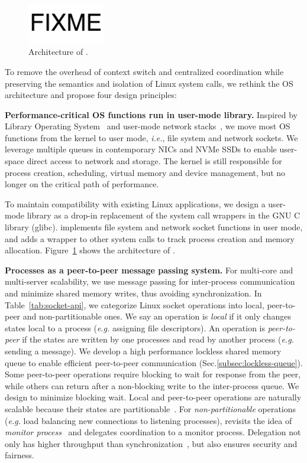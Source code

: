\begin{figure}[t]
	\centering
	\includegraphics[width=0.3\textwidth]{images/fixme}
	\caption{Architecture of \sys{}.}
	\label{fig:architecture}
\end{figure}


To remove the overhead of context switch and centralized coordination while preserving the semantics and isolation of Linux system calls, we rethink the OS architecture and propose four design principles:

\textbf{Performance-critical OS functions run in user-mode library.}
Inspired by Library Operating System~ and user-mode network stacks~, we move most OS functions from the kernel to user mode, \textit{i.e.}, file system and network sockets. We leverage multiple queues in contemporary NICs and NVMe SSDs to enable user-space direct access to network and storage. The kernel is still responsible for process creation, scheduling, virtual memory and device management, but no longer on the critical path of performance.

To maintain compatibility with existing Linux applications, we design a user-mode library \libipc as a drop-in replacement of the system call wrappers in the GNU C library (glibc). \libipc implements file system and network socket functions in user mode, and adds a wrapper to other system calls to track process creation and memory allocation. Figure~\ref{fig:architecture} shows the architecture of \sys{}.

\textbf{Processes as a peer-to-peer message passing system.}
For multi-core and multi-server scalability, we use message passing for inter-process communication and minimize shared memory writes, thus avoiding synchronization. In Table~\ref{tab:socket-api}, we categorize Linux socket operations into local, peer-to-peer and non-partitionable ones. We say an operation is \textit{local} if it only changes states local to a process (\textit{e.g.} assigning file descriptors). An operation is \textit{peer-to-peer} if the states are written by one processes and read by another process (\textit{e.g.} sending a message). We develop a high performance lockless shared memory queue to enable efficient peer-to-peer communication (Sec.\ref{subsec:lockless-queue}). Some peer-to-peer operations require blocking to wait for response from the peer, while others can return after a non-blocking write to the inter-process queue. We design to minimize blocking wait. Local and peer-to-peer operations are naturally scalable because their states are partitionable~\cite{partitionable}. For \textit{non-partitionable} operations (\textit{e.g.} load balancing new connections to listening processes), \libipc revisits the idea of \textit{monitor process}~\cite{hoare1974monitors} and delegates coordination to a monitor process. Delegation not only has higher throughput than synchronization~\cite{roghanchi2017ffwd}, but also ensures security and fairness.

